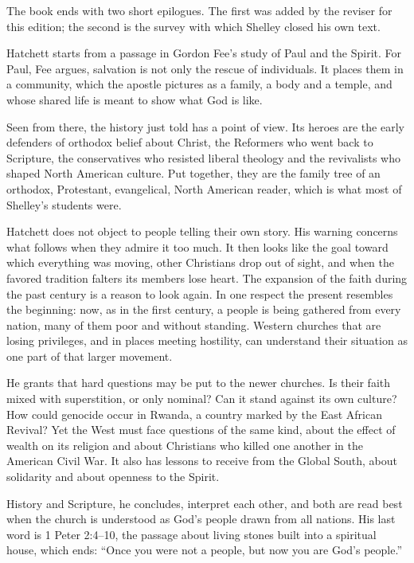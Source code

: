 
\noindent The book ends with two short epilogues. The first was added by the reviser for this edition;
the second is the survey with which Shelley closed his own text.

Hatchett starts from a passage in Gordon Fee's study of Paul and the Spirit. For Paul, Fee argues,
salvation is not only the rescue of individuals. It places them in a community, which the apostle
pictures as a family, a body and a temple, and whose shared life is meant to show what God is like.

Seen from there, the history just told has a point of view. Its heroes are the early defenders of
orthodox belief about Christ, the Reformers who went back to Scripture, the conservatives who resisted
liberal theology and the revivalists who shaped North American culture. Put together, they are the
family tree of an orthodox, Protestant, evangelical, North American reader, which is what most of
Shelley's students were.

Hatchett does not object to people telling their own story. His warning concerns what follows when
they admire it too much. It then looks like the goal toward which everything was moving, other
Christians drop out of sight, and when the favored tradition falters its members lose heart. The
expansion of the faith during the past century is a reason to look again. In one respect the present
resembles the beginning: now, as in the first century, a people is being gathered from every nation,
many of them poor and without standing. Western churches that are losing privileges, and in places
meeting hostility, can understand their situation as one part of that larger movement.

He grants that hard questions may be put to the newer churches. Is their faith mixed with superstition,
or only nominal? Can it stand against its own culture? How could genocide occur in Rwanda, a country
marked by the East African Revival? Yet the West must face questions of the same kind, about the
effect of wealth on its religion and about Christians who killed one another in the American Civil
War. It also has lessons to receive from the Global South, about solidarity and about openness to the
Spirit.

History and Scripture, he concludes, interpret each other, and both are read best when the church is
understood as God's people drawn from all nations. His last word is 1 Peter 2:4--10, the passage about
living stones built into a spiritual house, which ends: ``Once you were not a people, but now you are
God's people.''

